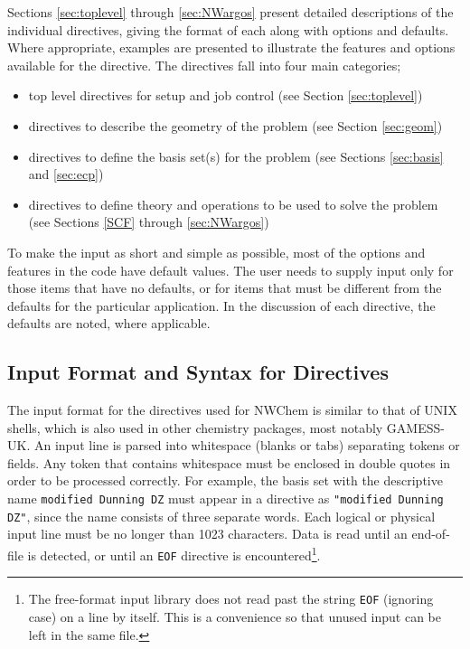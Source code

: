 Sections \ref{sec:toplevel} through \ref{sec:NWargos} present detailed 
descriptions of the individual
directives, giving the format of each along with options and defaults.  Where
appropriate, examples are presented to illustrate the features and options
available for the directive.  The directives fall into four main categories;

\begin{itemize}
\item top level directives for setup and job control (see Section \ref{sec:toplevel})
\item directives to describe the geometry of the problem (see Section \ref{sec:geom})
\item directives to define the basis set(s) for the problem (see Sections 
\ref{sec:basis} and \ref{sec:ecp})
\item directives to define theory and operations to be used to solve the problem 
(see Sections \ref{SCF} through \ref{sec:NWargos})
\end{itemize}

To make the input as short and simple as possible, most of the options and
features in the code have default values.  The user needs to supply input only
for those items that have no defaults, or for items that must be different
from the defaults for the particular application.  In the discussion of each
directive, the defaults are noted, where applicable.

\subsection{Input Format and Syntax for Directives}
\label{sec:syntax}

The input format for the directives used for NWChem is similar to that 
of UNIX shells, 
which is also used in other chemistry packages, most notably GAMESS-UK.  An
input line is parsed into whitespace (blanks or tabs) separating tokens
or fields.  Any token that contains whitespace must be enclosed in
double quotes in order to be processed correctly.  For example, the basis 
set with the descriptive name
\verb+modified Dunning DZ+ must appear in a directive as 
\verb+"modified Dunning DZ"+, since the name consists of three separate words.
Each logical or physical input line must be no longer than 1023 characters.
Data is read until an end-of-file is detected, or until an \verb+EOF+ 
directive is encountered\footnote{The
  free-format input library does not read past the string \verb+EOF+
  (ignoring case) on a line by itself.  This is a convenience so that
  unused input can be left in the same file.}.

